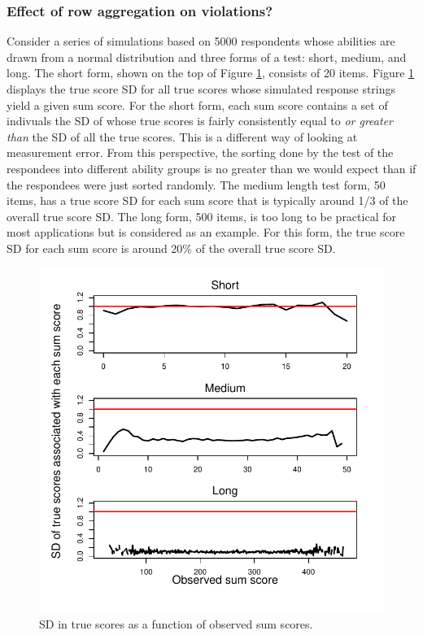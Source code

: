 \documentclass[12pt]{article}
\begin{document}
\subsubsection{Effect of row aggregation on violations?} \label{noisy_rows}
Consider a series of simulations based on 5000 respondents whose abilities are drawn from a normal distribution and three forms of a test: short, medium, and long. The short form, shown on the top of Figure \ref{noise}, consists of 20 items. Figure \ref{noise} displays the true score SD for all true scores whose simulated response strings yield a given sum score. For the short form, each sum score contains a set of indivuals the SD of whose true scores is fairly consistently equal to {\em or greater than} the SD of all the true scores. This is a different way of looking at measurement error. From this perspective, the sorting done by the test of the respondees into different ability groups is no greater than we would expect than if the respondees were just sorted randomly. The medium length test form, 50 items, has a true score SD for each sum score that is typically around 1/3 of the overall true score SD. The long form, 500 items, is too long to be practical for most applications but is considered as an example. For this form, the true score SD for each sum score is around 20\% of the overall true score SD.

\begin{figure}
\centering
\caption{SD in true scores as a function of observed sum scores.} \label{noise}
\includegraphics[width=\textwidth]{./figs/noise}
\end{figure}
\end{document}
